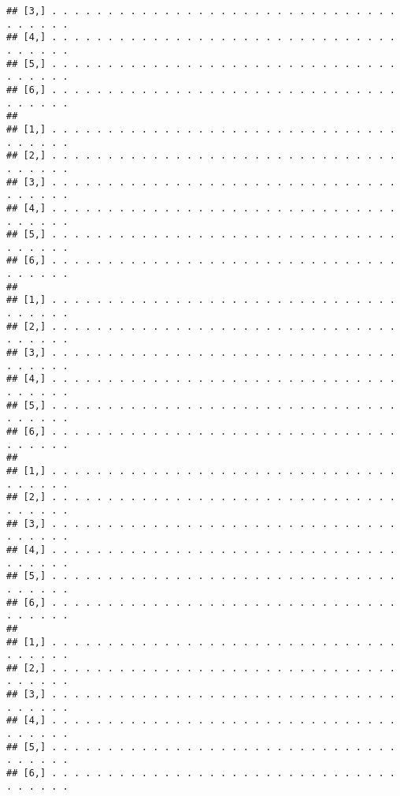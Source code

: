 \documentclass[
]{book}
\begin{document}
\begin{verbatim}
## [3,] . . . . . . . . . . . . . . . . . . . . . . . . . . . . . . . . . . . . .
## [4,] . . . . . . . . . . . . . . . . . . . . . . . . . . . . . . . . . . . . .
## [5,] . . . . . . . . . . . . . . . . . . . . . . . . . . . . . . . . . . . . .
## [6,] . . . . . . . . . . . . . . . . . . . . . . . . . . . . . . . . . . . . .
##                                                                               
## [1,] . . . . . . . . . . . . . . . . . . . . . . . . . . . . . . . . . . . . .
## [2,] . . . . . . . . . . . . . . . . . . . . . . . . . . . . . . . . . . . . .
## [3,] . . . . . . . . . . . . . . . . . . . . . . . . . . . . . . . . . . . . .
## [4,] . . . . . . . . . . . . . . . . . . . . . . . . . . . . . . . . . . . . .
## [5,] . . . . . . . . . . . . . . . . . . . . . . . . . . . . . . . . . . . . .
## [6,] . . . . . . . . . . . . . . . . . . . . . . . . . . . . . . . . . . . . .
##                                                                               
## [1,] . . . . . . . . . . . . . . . . . . . . . . . . . . . . . . . . . . . . .
## [2,] . . . . . . . . . . . . . . . . . . . . . . . . . . . . . . . . . . . . .
## [3,] . . . . . . . . . . . . . . . . . . . . . . . . . . . . . . . . . . . . .
## [4,] . . . . . . . . . . . . . . . . . . . . . . . . . . . . . . . . . . . . .
## [5,] . . . . . . . . . . . . . . . . . . . . . . . . . . . . . . . . . . . . .
## [6,] . . . . . . . . . . . . . . . . . . . . . . . . . . . . . . . . . . . . .
##                                                                               
## [1,] . . . . . . . . . . . . . . . . . . . . . . . . . . . . . . . . . . . . .
## [2,] . . . . . . . . . . . . . . . . . . . . . . . . . . . . . . . . . . . . .
## [3,] . . . . . . . . . . . . . . . . . . . . . . . . . . . . . . . . . . . . .
## [4,] . . . . . . . . . . . . . . . . . . . . . . . . . . . . . . . . . . . . .
## [5,] . . . . . . . . . . . . . . . . . . . . . . . . . . . . . . . . . . . . .
## [6,] . . . . . . . . . . . . . . . . . . . . . . . . . . . . . . . . . . . . .
##                                                                               
## [1,] . . . . . . . . . . . . . . . . . . . . . . . . . . . . . . . . . . . . .
## [2,] . . . . . . . . . . . . . . . . . . . . . . . . . . . . . . . . . . . . .
## [3,] . . . . . . . . . . . . . . . . . . . . . . . . . . . . . . . . . . . . .
## [4,] . . . . . . . . . . . . . . . . . . . . . . . . . . . . . . . . . . . . .
## [5,] . . . . . . . . . . . . . . . . . . . . . . . . . . . . . . . . . . . . .
## [6,] . . . . . . . . . . . . . . . . . . . . . . . . . . . . . . . . . . . . .

\end{verbatim}
\end{document}
